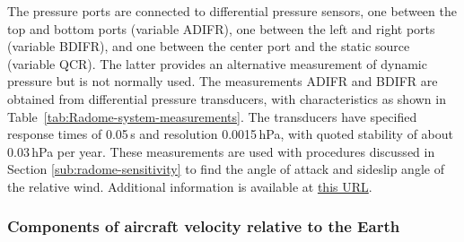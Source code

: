 \documentclass[12pt,twoside,english]{article}\usepackage[]{graphicx}\usepackage[]{color}
\let\OrgIndex\index
\renewcommand*{\index}[1]{\OrgIndex{#1}}
\begin{document}
{The pressure ports are connected to differential pressure sensors, one between the top and bottom ports (variable ADIFR), one between the left and right ports (variable BDIFR), and one between the center port and the static source (variable QCR). The latter provides an alternative measurement of dynamic pressure but is not normally used. The measurements ADIFR and BDIFR are obtained from differential pressure transducers, with characteristics as shown in Table~\ref{tab:Radome-system-measurements}. The transducers have specified response times of 0.05\,s and resolution 0.0015\,hPa, with quoted stability of about 0.03\,hPa per year. These measurements are used with procedures discussed in Section \ref{sub:radome-sensitivity} to find the angle of attack and sideslip angle of the relative wind. Additional information is available at \href{https://www.eol.ucar.edu/instruments/radome-gust-probe-3-d-wind-measurements}{this URL}. 


\subsubsection{Components of aircraft velocity relative to the Earth}

}
\end{document}
